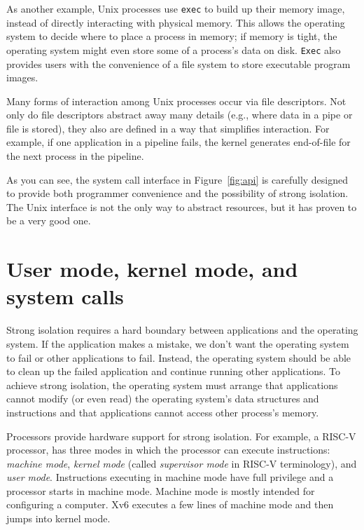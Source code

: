 As another example, Unix processes use 
\lstinline{exec}
to build up their memory image, instead of directly interacting with physical
memory.  This allows the operating system to decide where to place a process in
memory; if memory is tight, the operating system might even store some of
a process's data on disk.
\lstinline{Exec}
also provides
users with the convenience of a file system to store executable program images.  

Many forms of interaction among Unix processes occur via file descriptors.
Not only do file descriptors abstract away many details (e.g.,
where data in a pipe or file is stored), they also are defined in a
way that simplifies interaction.
For example, if one application in a pipeline fails, the kernel
generates end-of-file for the next process in the pipeline.

As you can see, the system call interface in
Figure~\ref{fig:api}
is carefully designed to provide both programmer convenience and
the possibility of strong isolation.  The Unix interface
is not the only way to abstract resources, but it has proven to be a very good
one.

\section{User mode, kernel mode, and system calls}

Strong isolation requires a hard boundary between applications and the operating
system.  If the application makes a mistake, we don't want the operating system
to fail or other applications to fail. Instead, the operating system should be
able to clean up the failed application and continue running other applications.
To achieve strong isolation, the operating system must arrange that applications cannot modify (or even
read) the operating system's data structures and instructions and that
applications cannot access other process's memory.

Processors provide hardware support for strong isolation.   For
example, a RISC-V processor, has three modes in which
the processor can execute instructions:
\textit{machine mode},
\textit{kernel mode} 
(called
\textit{supervisor mode}
in RISC-V terminology), and
\textit{user mode}.
Instructions executing in machine mode have full privilege and a
processor starts in machine mode.  Machine mode is mostly intended for
configuring a computer.  Xv6 executes a few lines of machine mode and
then jumps into kernel mode.

